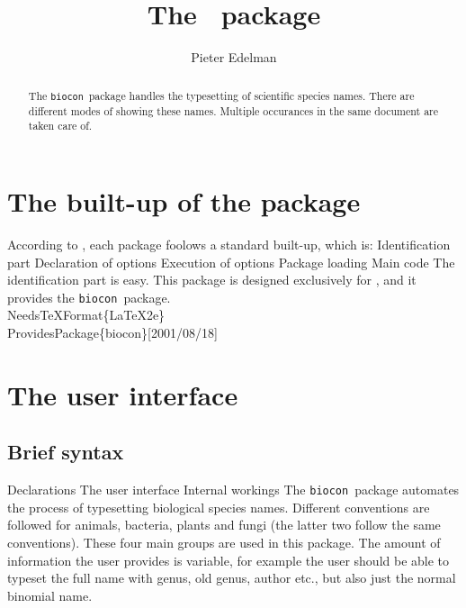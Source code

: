 \documentclass{article}%
\title{The \biocon\ package}
\author{Pieter Edelman}
\newcommand{\biocon}{\texttt{biocon}}
\begin{document}
\nwdocspar
\maketitle

\begin{abstract}
The \biocon\ package handles the typesetting of scientific species names. There are different modes of showing these names. Multiple occurances in the same document are taken care of.
\end{abstract}
\tableofcontents
\section{The built-up of the package}
According to \cite{Goossens1994}, each package foolows a standard built-up, which is:
\nwenddocs{}\endmoddef\nwstartdeflinemarkup\nwenddeflinemarkup
\LA{}Identification part\RA{}
\LA{}Declaration of options\RA{}
\LA{}Execution of options\RA{}
\LA{}Package loading\RA{}
\LA{}Main code\RA{}
\nwendcode{}\nwdocspar
The identification part is easy. This package is designed exclusively for \LaTeXe, and it provides the \biocon\ package.
\nwenddocs{}\endmoddef\nwstartdeflinemarkup\nwenddeflinemarkup
\\NeedsTeXFormat\{LaTeX2e\}
\\ProvidesPackage\{biocon\}[2001/08/18]
\nwendcode{}\nwdocspar
\section{The user interface}
\subsection{Brief syntax}
\nwenddocs{}\endmoddef\nwstartdeflinemarkup\nwenddeflinemarkup
\LA{}Declarations\RA{}
\LA{}The user interface\RA{}
\LA{}Internal workings\RA{}
\nwendcode{}\nwdocspar
The \biocon\ package automates the process of typesetting biological species names. Different conventions are followed for animals, bacteria, plants and fungi (the latter two follow the same conventions). These four main groups are used in this package. The amount of information the user provides is variable, for example the user should be able to typeset the full name with genus, old genus, author etc., but also just the normal binomial name.
\end{document}
